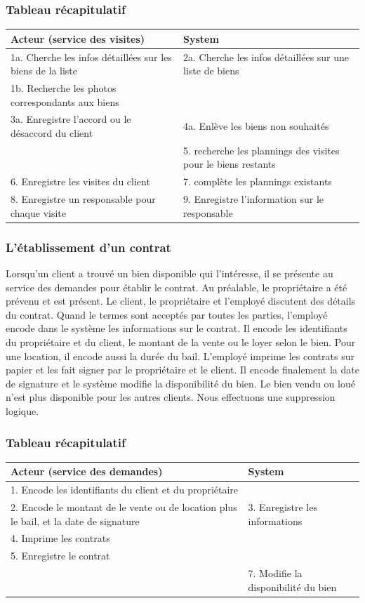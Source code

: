 \subsubsection*{Tableau récapitulatif}
\begin{longtable}{|p{7.5cm}|p{7.5cm}|}
\hline
Acteur (service des visites)& System\\
\hline
1a. Cherche les infos détaillées sur les biens de la liste & 2a. Cherche les infos détaillées sur une liste de biens\\
1b. Recherche les photos correspondants aux biens & \\
3a. Enregistre l'accord ou le désaccord du client & 4a. Enlève les biens non souhaités\\
& 5. recherche les plannings des visites pour le biens restants\\
6. Enregistre les visites du client & 7. complète les plannings existants\\
8. Enregistre un responsable pour chaque visite & 9. Enregistre l'information sur le responsable\\
\hline
\end{longtable}

\subsubsection{L'établissement d'un contrat}
Lorsqu'un client a trouvé un bien disponible qui l'intéresse, il se présente au service des demandes pour établir le contrat. Au préalable, le propriétaire a été prévenu et est présent. 
Le client, le propriétaire et l'employé discutent des détails du contrat.
Quand le termes sont acceptés par toutes les parties, l'employé encode dans le système les informations sur le contrat.
Il encode les identifiants du propriétaire et du client, le montant de la vente ou le loyer selon le bien.
Pour une location, il encode aussi la durée du bail.
L'employé imprime les contrats sur papier et les fait signer par le propriétaire et le client.
Il encode finalement la date de signature et le système modifie la disponibilité du bien.
Le bien vendu ou loué n'est plus disponible pour les autres clients. Nous effectuons une suppression logique.

\subsubsection*{Tableau récapitulatif}
\begin{longtable}{|p{7.5cm}|p{7.5cm}|}
\hline
Acteur (service des demandes)& System\\
\hline
1. Encode les identifiants du client et du propriétaire & \\
2. Encode le montant de le vente ou de location plus le bail, et la date de signature & 3. Enregistre les informations\\
4. Imprime les contrats & \\
5. Enregistre le contrat \\
& 7. Modifie la disponibilité du bien\\
\hline
\end{longtable}

